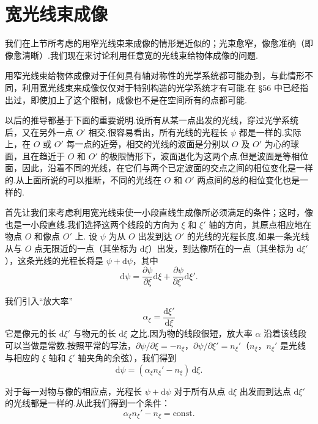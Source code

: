 \section{宽光线束成像}

我们在上节所考虑的用窄光线束来成像的情形是近似的；光束愈窄，像愈准确（即像愈清晰）.我们现在来讨论利用任意宽的光线束给物体成像的问题.

用窄光线束给物体成像对于任何具有轴对称性的光学系统都可能办到，与此情形不同，利用宽光线束来成像仅仅对于特别构造的光学系统才有可能.在 §56 中已经指出过，即使加上了这个限制，成像也不是在空间所有的点都可能.

以后的推导都基于下面的重要说明.设所有从某一点出发的光线，穿过光学系统后，又在另外一点 $O'$ 相交.很容易看出，所有光线的光程长 $\psi$ 都是一样的.实际上，在 $O$ 或 $O'$ 每一点的近旁，相交的光线的波面是分别以 $O$ 及 $O'$ 为心的球面，且在趋近于 $O$ 和 $O'$ 的极限情形下，波面退化为这两个点.但是波面是等相位面，因此，沿着不同的光线，在它们与两个已定波面的交点之间的相位变化是一样的.从上面所说的可以推断，不同的光线在 $O$ 和 $O'$ 两点间的总的相位变化也是一样的.

首先让我们来考虑利用宽光线束使一小段直线生成像所必须满足的条件；这时，像也是一小段直线.我们选择这两个线段的方向为 $\xi$ 和 $\xi'$ 轴的方向，其原点相应地在物点 $O$ 和像点 $O'$ 上. 设 $\psi$ 为从 $O$ 出发到达 $O'$ 的光线的光程长度.如果一条光线从与 $O$ 点无限近的一点（其坐标为 $\mathrm{d}\xi$）出发，到达像所在的一点（其坐标为 $\mathrm{d}\xi'$），这条光线的光程长将是 $\psi+\mathrm{d}\psi$，其中
\begin{equation*}
  \mathrm{d}\psi=\frac{\partial\psi}{\partial\xi}\mathrm{d}\xi
  +\frac{\partial\psi}{\partial\xi'}\mathrm{d}\xi'.
\end{equation*}

我们引入“放大率”
\begin{equation*}
  \alpha_\xi=\frac{\mathrm{d}\xi'}{\mathrm{d}\xi}
\end{equation*}
它是像元的长 $\mathrm{d}\xi'$ 与物元的长 $\mathrm{d}\xi$ 之比.因为物的线段很短，放大率 $\alpha$ 沿着该线段可以当做是常数.按照平常的写法，$\partial\psi/\partial\xi=-n_\xi$，$\partial\psi/\partial\xi'=n_\xi'$（$n_\xi$，$n_\xi'$ 是光线与相应的 $\xi$ 轴和 $\xi'$ 轴夹角的余弦），我们得到
\begin{equation*}
  \mathrm{d}\psi=(\alpha_\xi n_\xi'-n_\xi)\,\mathrm{d}\xi.
\end{equation*}

对于每一对物与像的相应点，光程长 $\psi+\mathrm{d}\psi$ 对于所有从点 $\mathrm{d}\xi$ 出发而到达点 $\mathrm{d}\xi'$ 的光线都是一样的.从此我们得到一个条件：
\begin{equation}
  \alpha_\xi n_\xi'-n_\xi=\mathrm{const}.
\end{equation}

